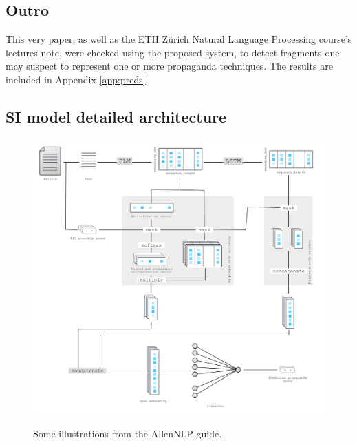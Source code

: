 \documentclass[11pt]{article}
\newcommand{\pol}[1]{{\fontfamily{pcr}\selectfont#1}}
\begin{document}
\subsection{Outro}
This very paper, as well as the ETH Zürich Natural Language Processing course's lectures note, were checked using the proposed system, to detect fragments one may suspect to represent one or more propaganda techniques. The results are included in Appendix \ref{app:preds}.

\nocite{*}




\clearpage
\pagebreak

\onecolumn
\begin{appendices}


\section{\pol{SI} model detailed architecture} \label{app:si}
\begin{figure}[h]
    \centering
    \includegraphics[width=\textwidth]{images/si.png}
    \label{fig:si-architecture}
    \caption{Some illustrations from the \pol{AllenNLP} guide.}
\end{figure}

\clearpage
\pagebreak

\end{appendices}
\end{document}
